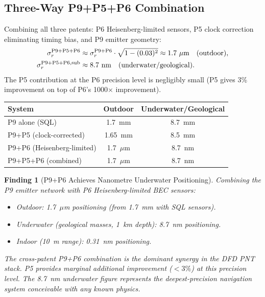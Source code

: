 \documentclass[aps,prd,twocolumn,superscriptaddress,nofootinbib]{revtex4-2}
\newtheorem{finding}{Finding}
\begin{document}
\subsection{Three-Way P9+P5+P6 Combination}

Combining all three patents: P6 Heisenberg-limited sensors,
P5 clock correction eliminating timing bias, and P9 emitter geometry:
\begin{align}
  \sigma_r^{\rm P9+P5+P6} &\approx \sigma_r^{\rm P9+P6}
  \cdot \sqrt{1 - (0.03)^2} \approx 1.7~\mu\mathrm{m}
  \quad\text{(outdoor)}, \\
  \sigma_r^{\rm P9+P5+P6,\rm sub} &\approx 8.7~\mathrm{nm}
  \quad\text{(underwater/geological)}.
\end{align}
The P5 contribution at the P6 precision level is negligibly small
(P5 gives 3\% improvement on top of P6's 1000$\times$ improvement).

\begin{center}
\begin{tabular}{lcc}
\toprule
System & Outdoor & Underwater/Geological \\
\midrule
P9 alone (SQL) & 1.7~mm & 8.7~mm \\
P9+P5 (clock-corrected) & 1.65~mm & 8.5~mm \\
P9+P6 (Heisenberg-limited) & 1.7~$\mu$m & 8.7~nm \\
P9+P5+P6 (combined) & 1.7~$\mu$m & 8.7~nm \\
\bottomrule
\end{tabular}
\end{center}

\begin{finding}[P9+P6 Achieves Nanometre Underwater Positioning]
\label{find:p9p6}
Combining the P9 emitter network with P6 Heisenberg-limited BEC sensors:
\begin{itemize}
  \item Outdoor: 1.7~$\mu$m positioning (from 1.7~mm with SQL sensors).
  \item Underwater (geological masses, 1~km depth): 8.7~nm positioning.
  \item Indoor (10~m range): 0.31~nm positioning.
\end{itemize}
The cross-patent P9+P6 combination is the dominant synergy in the DFD
PNT stack.  P5 provides marginal additional improvement ($< 3\%$) at
this precision level.  The 8.7~nm underwater figure represents the
deepest-precision navigation system conceivable with any known physics.
\end{finding}
\end{document}
